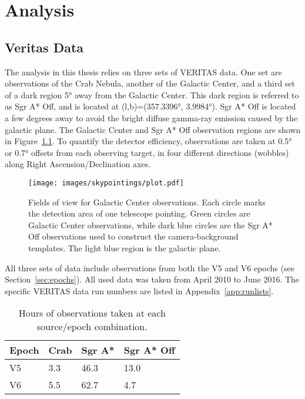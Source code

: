 \cleartooddpage[\thispagestyle{empty}]
\chapter{Analysis}\label{chapter:analysis}

\section{Veritas Data}\label{veritasdata}
  The analysis in this thesis relies on three sets of VERITAS data.
  One set are observations of the Crab Nebula, another of the Galactic Center, and a third set of a dark region \nicetilde\ang{5} away from the Galactic Center.
  This dark region is referred to as  Sgr A* Off, and is located at (l,b)=(\ang{357.3396}, \ang{3.9984}).
  Sgr A* Off is located a few degrees away to avoid the bright diffuse gamma-ray emission caused by the galactic plane.
  The Galactic Center and Sgr A* Off observation regions are shown in Figure~\ref{fig:gcfieldsofview}.
  To quantify the detector efficiency, observations are taken at \ang{0.5} or \ang{0.7} offsets from each observing target, in four different directions (wobbles) along Right Ascension/Declination axes.

  \begin{figure}[ht]
    \centering
    \texttt{[image: images/skypointings/plot.pdf]}
    \caption[VERITAS Galactic Center Pointings]{
      Fields of view for Galactic Center observations.
      Each circle marks the detection area of one telescope pointing.
      Green circles are Galactic Center observations, while dark blue circles are the Sgr A* Off observations used to construct the camera-background templates.
      The light blue region is the galactic plane.
    }
    \label{fig:gcfieldsofview}
  \end{figure}

  All three sets of data include observations from both the V5 and V6 epochs (see Section~\ref{sec:epochs}).
  All used data was taken from April 2010 to June 2016.
  The specific VERITAS data run numbers are listed in Appendix~\ref{app:runlists}.

  \begin{table}[]
    \centering
    \caption{Hours of observations taken at each source/epoch combination.}
    \label{tab:observation_times}
    \begin{tabular}{|l|l|l|l|}
      \hline
      \textbf{Epoch} & \textbf{Crab} & \textbf{Sgr A*} & \textbf{Sgr A* Off} \\ \hline
      V5             & 3.3           & 46.3            & 13.0                \\ \hline
      V6             & 5.5           & 62.7            & 4.7                 \\ \hline
    \end{tabular}
  \end{table}


